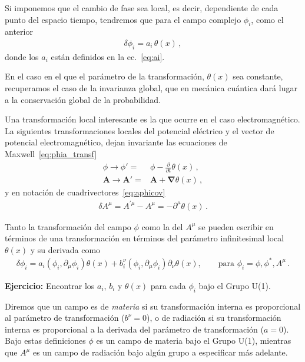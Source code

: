 Si imponemos que el cambio de fase sea local, es decir, dependiente de cada punto  del espacio tiempo, tendremos que para el campo complejo  $\phi_{i}$, como el anterior 
\begin{align}
  \delta\phi_i=a_i\,\theta(x)\,,
\end{align}
donde los $a_i$ están definidos en la ec.~\eqref{eq:ai}.

En el caso en el que el parámetro de la transformación, $\theta(x)$ sea constante, recuperamos el caso de la invarianza global, que en mecánica cuántica dará lugar a la conservación global de la probabilidad. 

Una transformación local interesante es la que ocurre en el caso electromagnético. La siguientes transformaciones locales del potencial eléctrico y el vector de potencial electromagnético, dejan invariante las ecuaciones de Maxwell~\eqref{eq:phia_transf}
\begin{align}
  \phi \to \phi'=&\phi-\frac{\partial}{\partial t}\theta(x)\,,\nonumber\\
  \mathbf{A} \to \mathbf{A}'=&\mathbf{A}+ \boldsymbol{\nabla}\theta(x)\,,
\end{align}
y en notación de cuadrivectores~\eqref{eq:aphicov}
\begin{align}
  \delta A^{\mu}=A^{\prime\mu}-A^{\mu}=-\partial^\mu \theta(x)\,.
\end{align}

\begin{frame}
Tanto la transformación del campo $\phi$ como la del $A^{\mu}$ se pueden escribir en términos de una transformación en términos del parámetro infinitesimal local $\theta(x)$ y su derivada como
\begin{align}
\label{eq:dfi}
  \delta\phi_i= a_{i}\left( \phi_{i},\partial_{\mu}\phi_{i} \right) \theta(x)+b^{\nu}_i \left( \phi_{i},\partial_{\mu}\phi_{i} \right) \partial_{\nu}\theta(x),\qquad \text{para $\phi_{i}=\phi,\phi^{*},A^{\mu}$}\,.
\end{align}
\end{frame}
\textbf{Ejercicio:} Encontrar los $a_i$, $b_i$ y  $\theta(x)$ para cada $\phi_i$ bajo el Grupo U(1).

Diremos que un campo es de \emph{materia} si su transformación interna es proporcional al parámetro de transformación ($b^{\nu}=0$), o de radiación si su transformación interna es proporcional a la derivada del parámetro de transformación ($a=0$). Bajo estas definiciones $\phi$ es un campo de materia bajo el Grupo U(1), mientras que $A^{\mu}$ es un campo de radiación bajo algún grupo a especificar más adelante. 

